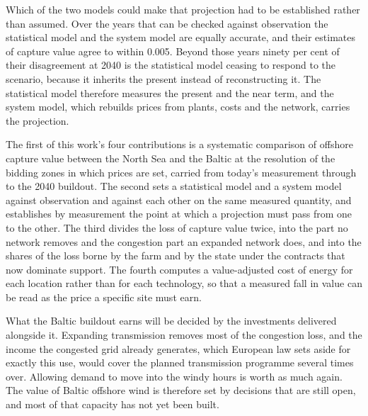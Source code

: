 Which of the two models could make that projection had to be established
rather than assumed. Over the years that can be checked against observation
the statistical model and the system model are equally accurate, and their
estimates of capture value agree to within 0.005. Beyond those years ninety
per cent of their disagreement at 2040 is the statistical model ceasing to
respond to the scenario, because it inherits the present instead of
reconstructing it. The statistical model therefore measures the present and
the near term, and the system model, which rebuilds prices from plants, costs
and the network, carries the projection.

The first of this work's four contributions is a systematic comparison of
offshore capture value between the North Sea and the Baltic at the resolution
of the bidding zones in which prices are set, carried from today's measurement
through to the 2040 buildout. The second sets a statistical model and a system
model against observation and against each other on the same measured
quantity, and establishes by measurement the point at which a projection must
pass from one to the other. The third divides the loss of capture value twice,
into the part no network removes and the congestion part an expanded network
does, and into the shares of the loss borne by the farm and by the state under
the contracts that now dominate support. The fourth computes a value-adjusted
cost of energy for each location rather than for each technology, so that a
measured fall in value can be read as the price a specific site must earn.

What the Baltic buildout earns will be decided by the investments delivered
alongside it. Expanding transmission removes most of the congestion loss, and
the income the congested grid already generates, which European law sets aside
for exactly this use, would cover the planned transmission programme several
times over. Allowing demand to move into the windy hours is worth as much
again. The value of Baltic offshore wind is therefore set by decisions that
are still open, and most of that capacity has not yet been built.